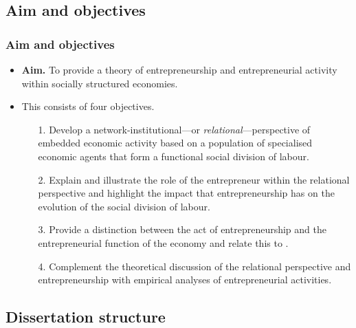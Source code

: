 \documentclass[10pt]{beamer}
\begin{document}
\subsection{Aim and objectives}

\begin{frame} \frametitle{Aim and objectives}
\begin{itemize}
\item \textbf{Aim.} To provide a theory of entrepreneurship and entrepreneurial activity within socially structured economies.
\medskip
\item This consists of four objectives.
\begin{itemize}
\medskip
\item[1.] Develop a network-institutional---or \emph{relational}---perspective of embedded economic activity based on a population of specialised economic agents that form a functional social division of labour.
\medskip
\item[2.] Explain and illustrate the role of the entrepreneur within the relational perspective and highlight the impact that entrepreneurship has on the evolution of the social division of labour.
\medskip
\item[3.] Provide a distinction between the act of entrepreneurship and the entrepreneurial function of the economy and relate this to .
\medskip
\item[4.] Complement the theoretical discussion of the relational perspective and entrepreneurship with empirical analyses of entrepreneurial activities.
\end{itemize}
\end{itemize}
\end{frame}

\subsection{Dissertation structure}
\end{document}
